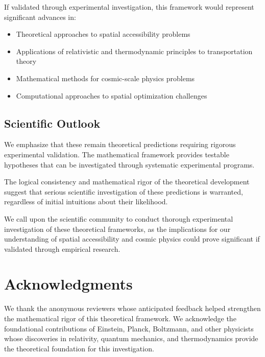 \documentclass[12pt,a4paper]{article}
\begin{document}
If validated through experimental investigation, this framework would represent significant advances in:

\begin{itemize}
\item Theoretical approaches to spatial accessibility problems
\item Applications of relativistic and thermodynamic principles to transportation theory
\item Mathematical methods for cosmic-scale physics problems
\item Computational approaches to spatial optimization challenges
\end{itemize}

\subsection{Scientific Outlook}

We emphasize that these remain theoretical predictions requiring rigorous experimental validation. The mathematical framework provides testable hypotheses that can be investigated through systematic experimental programs.

The logical consistency and mathematical rigor of the theoretical development suggest that serious scientific investigation of these predictions is warranted, regardless of initial intuitions about their likelihood.

We call upon the scientific community to conduct thorough experimental investigation of these theoretical frameworks, as the implications for our understanding of spatial accessibility and cosmic physics could prove significant if validated through empirical research.

\section*{Acknowledgments}

We thank the anonymous reviewers whose anticipated feedback helped strengthen the mathematical rigor of this theoretical framework. We acknowledge the foundational contributions of Einstein, Planck, Boltzmann, and other physicists whose discoveries in relativity, quantum mechanics, and thermodynamics provide the theoretical foundation for this investigation.
\end{document}
